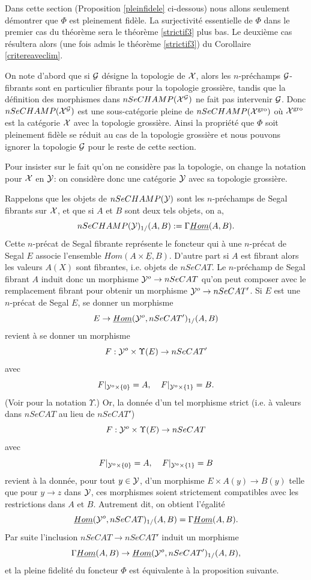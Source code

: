 \documentclass[12pt]{article}
\newcommand{\Gg}{{\cal G}}
\newcommand{\Xx}{{\cal X}}
\newcommand{\Yy}{{\cal Y}}
\begin{document}
Dans cette section (Proposition \ref{pleinfidele} ci-dessous) nous allons
seulement
d\'emontrer que $\Phi$ est pleinement fid\`ele. La surjectivit\'e essentielle de
$\Phi$ dans le premier cas du th\'eor\`eme
sera le th\'eor\`eme \ref{strictif3}
plus bas. Le deuxi\`eme cas r\'esultera alors
(une fois admis le th\'eor\`eme \ref{strictif3}) du Corollaire
\ref{critereaveclim}.

On note d'abord que si $\Gg$ d\'esigne la
topologie de $\Xx$,
alors les $n$-pr\'echamps $\Gg$-fibrants sont en particulier fibrants pour la
topologie grossi\`ere, tandis que la d\'efinition des morphismes dans
$nSeCHAMP(\Xx ^{\Gg})$
ne fait pas intervenir $\Gg$. Donc $nSeCHAMP(\Xx ^{\Gg} )$ est une
sous-cat\'egorie
pleine de $nSeCHAMP(\Xx ^{\rm gro})$ o\`u $\Xx ^{\rm gro}$ est la cat\'egorie
$\Xx$ avec
la topologie grossi\`ere. Ainsi la propri\'et\'e que $\Phi$ soit pleinement
fid\`ele  se r\'eduit au cas de la topologie grossi\`ere
et nous pouvons ignorer la topologie $\Gg$
pour le reste de cette
section.

Pour insister sur le fait qu'on ne consid\`ere pas la topologie, on change la
notation pour $\Xx$ en $\Yy$: on consid\`ere donc une cat\'egorie $\Yy$ avec sa
topologie grossi\`ere.

Rappelons que les objets de $nSeCHAMP(\Yy )$ sont les $n$-pr\'echamps de Segal
fibrants sur $\Xx$, et que si $A$ et $B$ sont deux tels objets, on a,
$$
nSeCHAMP (\Yy )_{1/}(A,B) := \Gamma \underline{Hom}(A,B).
$$
Cette $n$-pr\'ecat de Segal fibrante repr\'esente le foncteur qui \`a une
$n$-pr\'ecat de Segal $E$ associe l'ensemble $Hom (A\times \underline{E}, B)$.
D'autre part si $A$ est fibrant alors les valeurs $A(X)$ sont fibrantes, i.e.
objets de
$nSeCAT$. Le $n$-pr\'echamp de Segal fibrant $A$ induit donc un morphisme
$\Yy ^o \rightarrow  nSeCAT$ qu'on peut composer avec le
remplacement fibrant
pour obtenir un morphisme $\Yy ^o \rightarrow  nSeCAT'$.
Si $E$ est une $n$-pr\'ecat de Segal $E$, se donner un
morphisme
$$
E\rightarrow \underline{Hom}(\Yy ^o, nSeCAT')_{1/}(A,B)
$$
revient \`a se donner un morphisme
$$
F:\Yy ^o\times \Upsilon (E) \rightarrow nSeCAT'
$$
avec
$$
F|_{\Yy ^o \times \{ 0\}} = A,\;\;\;\;
F|_{\Yy ^o \times \{ 1\} } = B.
$$
(Voir \cite{limits} pour la notation $\Upsilon$.)
Or, la
donn\'ee d'un tel
morphisme strict (i.e. \`a valeurs dans $nSeCAT$ au lieu de $nSeCAT'$)
$$
F: \Yy ^o\times \Upsilon (E) \rightarrow nSeCAT
$$
avec
$$
F|_{\Yy ^o \times \{ 0\}} = A,\;\;\;\;
F|_{\Yy ^o \times \{ 1\}} = B
$$
revient \`a la donn\'ee, pour tout $y\in \Yy$, d'un morphisme
$E\times A(y)\rightarrow B(y)$ telle que pour $y\rightarrow z$ dans $\Yy$, ces
morphismes soient strictement compatibles avec les restrictions dans $A$ et $B$.
Autrement dit, on obtient l'\'egalit\'e
$$
\underline{Hom}(\Yy ^o, nSeCAT)_{1/}(A,B) = \Gamma \underline{Hom}(A,B).
$$
Par suite l'inclusion $nSeCAT \rightarrow nSeCAT'$ induit un morphisme
$$
\Gamma \underline{Hom}(A,B) \rightarrow
\underline{Hom}(\Yy ^o, nSeCAT')_{1/}(A,B),
$$
et la pleine fidelit\'e du foncteur
$\Phi$ est \'equivalente \`a la proposition suivante.
\end{document}
